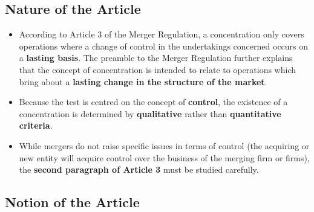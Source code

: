     \subsection{Nature of the Article}

        \begin{itemize}
            \item According to Article 3 of the Merger Regulation, a concentration only covers operations where a change of control in the undertakings concerned occurs on a \textbf{lasting basis}. The preamble to the Merger Regulation further explains that the concept of concentration is intended to relate to operations which bring about a \textbf{lasting change in the structure of the market}.
            \item Because the test is centred on the concept of \textbf{control}, the existence of a concentration is determined by \textbf{qualitative} rather than \textbf{quantitative criteria}.
            \item While mergers do not raise specific issues in terms of control (the acquiring or new entity will acquire control over the business of the merging firm or firms), the \textbf{second paragraph of Article 3} must be studied carefully.
        \end{itemize}

    \subsection{Notion of the Article}

